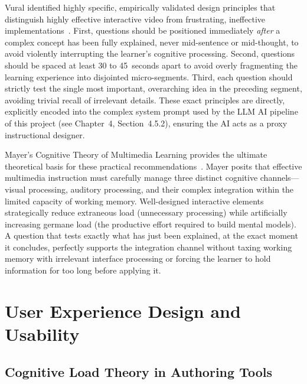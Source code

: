 Vural identified highly specific, empirically validated design principles that distinguish highly effective interactive video from frustrating, ineffective implementations~\cite{vural2013}. First, questions should be positioned immediately \emph{after} a complex concept has been fully explained, never mid-sentence or mid-thought, to avoid violently interrupting the learner's cognitive processing. Second, questions should be spaced at least 30 to 45~seconds apart to avoid overly fragmenting the learning experience into disjointed micro-segments. Third, each question should strictly test the single most important, overarching idea in the preceding segment, avoiding trivial recall of irrelevant details. These exact principles are directly, explicitly encoded into the complex system prompt used by the LLM AI pipeline of this project (see Chapter~4, Section~4.5.2), ensuring the AI acts as a proxy instructional designer.

Mayer's Cognitive Theory of Multimedia Learning provides the ultimate theoretical basis for these practical recommendations~\cite{mayer2009}. Mayer posits that effective multimedia instruction must carefully manage three distinct cognitive channels---visual processing, auditory processing, and their complex integration within the limited capacity of working memory. Well-designed interactive elements strategically reduce extraneous load (unnecessary processing) while artificially increasing germane load (the productive effort required to build mental models). A question that tests exactly what has just been explained, at the exact moment it concludes, perfectly supports the integration channel without taxing working memory with irrelevant interface processing or forcing the learner to hold information for too long before applying it.

\section{User Experience Design and Usability}

\subsection{Cognitive Load Theory in Authoring Tools}

